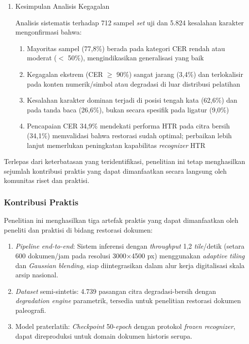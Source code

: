 \begin{enumerate}[leftmargin=1.5em, labelsep=0.5em, itemindent=0pt, label=\arabic*., topsep=0pt, partopsep=0pt]
\item Kesimpulan Analisis Kegagalan

Analisis sistematis terhadap 712 sampel \textit{set} uji dan 5.824 kesalahan karakter mengonfirmasi bahwa:
\begin{enumerate}[leftmargin=1.5em, labelsep=0.5em, itemindent=0pt, noitemsep, topsep=0pt, label=\alph*)]
    \item Mayoritas sampel (77,8\%) berada pada kategori CER rendah atau moderat ($<$ 50\%), mengindikasikan generalisasi yang baik
    \item Kegagalan ekstrem (CER $\geq$ 90\%) sangat jarang (3,4\%) dan terlokalisir pada konten numerik/simbol atau degradasi di luar distribusi pelatihan
    \item Kesalahan karakter dominan terjadi di posisi tengah kata (62,6\%) dan pada tanda baca (26,6\%), bukan secara spesifik pada ligatur (9,0\%)
    \item Pencapaian CER 34,9\% mendekati performa HTR pada citra bersih (34,1\%) memvalidasi bahwa restorasi sudah optimal; perbaikan lebih lanjut memerlukan peningkatan kapabilitas \textit{recognizer} HTR
\end{enumerate}
\end{enumerate}

Terlepas dari keterbatasan yang teridentifikasi, penelitian ini tetap menghasilkan sejumlah kontribusi praktis yang dapat dimanfaatkan secara langsung oleh komunitas riset dan praktisi.

\subsubsection{Kontribusi Praktis}
\label{subsubsec:kontribusi-praktis}

Penelitian ini menghasilkan tiga artefak praktis yang dapat dimanfaatkan oleh peneliti dan praktisi di bidang restorasi dokumen:
\begin{enumerate}[leftmargin=1.5em, labelsep=0.5em, itemindent=0pt, noitemsep, topsep=0pt, partopsep=0pt, label=\alph*)]
    \item \textit{Pipeline end-to-end}: Sistem inferensi dengan \textit{throughput} 1,2 \textit{tile}/detik (setara 600 dokumen/jam pada resolusi 3000×4500 px) menggunakan \textit{adaptive tiling} dan \textit{Gaussian blending}, siap diintegrasikan dalam alur kerja digitalisasi skala arsip nasional.
    \item \textit{Dataset} semi-sintetis: 4.739 pasangan citra degradasi-bersih dengan \textit{degradation engine} parametrik, tersedia untuk penelitian restorasi dokumen paleografi.
    \item Model praterlatih: \textit{Checkpoint} 50-\textit{epoch} dengan protokol \textit{frozen recognizer}, dapat direproduksi untuk domain dokumen historis serupa.
\end{enumerate}





